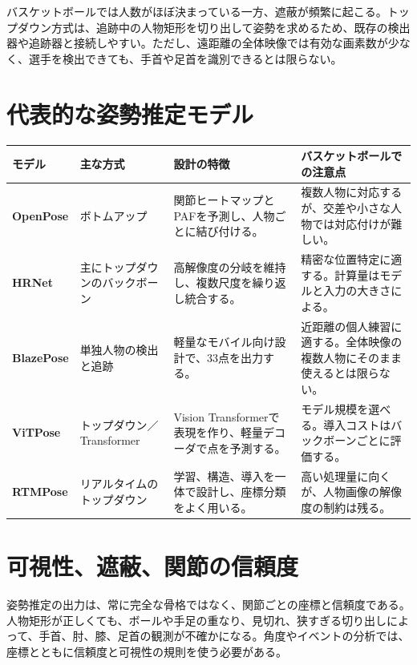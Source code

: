 \documentclass[11pt,a4paper,oneside]{report}
\begin{document}
バスケットボールでは人数がほぼ決まっている一方、遮蔽が頻繁に起こる。トップダウン方式は、追跡中の人物矩形を切り出して姿勢を求めるため、既存の検出器や追跡器と接続しやすい。ただし、遠距離の全体映像では有効な画素数が少なく、選手を検出できても、手首や足首を識別できるとは限らない。

\section{代表的な姿勢推定モデル}

\begin{tabularx}{\textwidth}{>{\bfseries\RaggedRight}p{2.7cm} p{3.1cm} Y Y}
\toprule
モデル & 主な方式 & 設計の特徴 & バスケットボールでの注意点 \\
\midrule
OpenPose & ボトムアップ & 関節ヒートマップとPAFを予測し、人物ごとに結び付ける。 & 複数人物に対応するが、交差や小さな人物では対応付けが難しい。\\
HRNet & 主にトップダウンのバックボーン & 高解像度の分岐を維持し、複数尺度を繰り返し統合する。 & 精密な位置特定に適する。計算量はモデルと入力の大きさによる。\\
BlazePose & 単独人物の検出と追跡 & 軽量なモバイル向け設計で、33点を出力する。 & 近距離の個人練習に適する。全体映像の複数人物にそのまま使えるとは限らない。\\
ViTPose & トップダウン／Transformer & Vision Transformerで表現を作り、軽量デコーダで点を予測する。 & モデル規模を選べる。導入コストはバックボーンごとに評価する。\\
RTMPose & リアルタイムのトップダウン & 学習、構造、導入を一体で設計し、座標分類をよく用いる。 & 高い処理量に向くが、人物画像の解像度の制約は残る。\\
\bottomrule
\end{tabularx}



\section{可視性、遮蔽、関節の信頼度}

姿勢推定の出力は、常に完全な骨格ではなく、関節ごとの座標と信頼度である。人物矩形が正しくても、ボールや手足の重なり、見切れ、狭すぎる切り出しによって、手首、肘、膝、足首の観測が不確かになる。角度やイベントの分析では、座標とともに信頼度と可視性の規則を使う必要がある。
\end{document}
